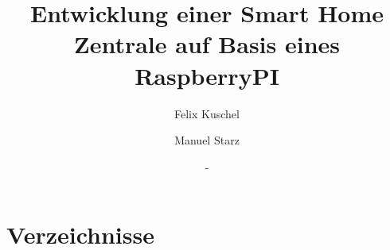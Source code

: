 \documentclass[12pt,a4paper]{article}
\author{Felix Kuschel
	\and Manuel Starz}
\title{Entwicklung einer Smart Home Zentrale auf Basis eines RaspberryPI}
\date{-}
\begin{document}
	
	\tableofcontents
	\newpage
	
 	
	
	
	
	
	
	
		
	
 	
 	\section{Verzeichnisse}
    \listoftables
 	\listoffigures
\end{document}
